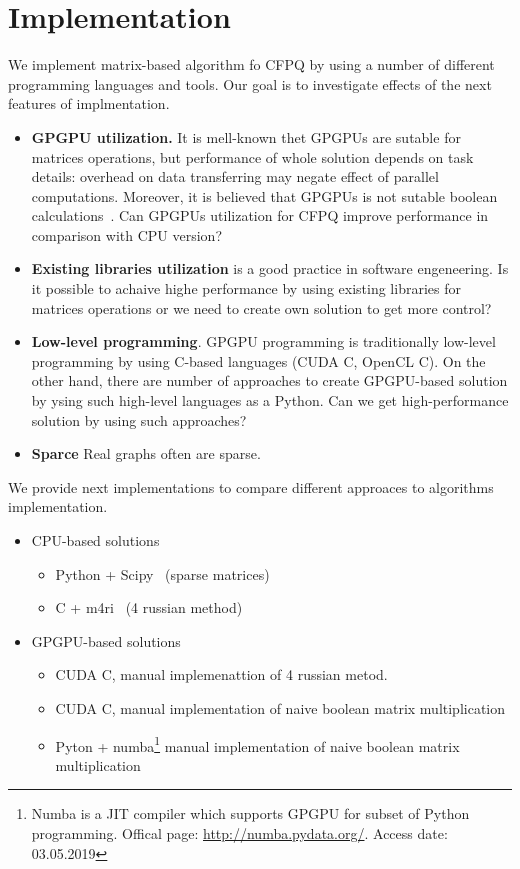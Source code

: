 \section{Implementation}

We implement matrix-based algorithm fo CFPQ by using a number of different programming languages and tools.
Our goal is to investigate effects of the next features of implmentation.
\begin{itemize}
\item \textbf{GPGPU utilization.} 
It is mell-known thet GPGPUs are sutable for matrices operations, but performance of whole solution depends on task details: overhead on data transferring may negate effect of parallel computations. 
Moreover, it is believed that GPGPUs is not sutable boolean calculations~\cite{!!!}. 
Can GPGPUs utilization for CFPQ improve performance in comparison with CPU version?

\item \textbf{Existing libraries utilization} is a good practice in software engeneering.
Is it possible to achaive highe performance by using existing libraries for matrices operations or we need to create own solution to get more control?

\item \textbf{Low-level programming}. 
GPGPU programming is traditionally low-level programming by using C-based languages (CUDA C, OpenCL C). 
On the other hand, there are number of approaches to create GPGPU-based solution by ysing such high-level languages as a Python. 
Can we get high-performance solution by using such approaches?

\item \textbf{Sparce} Real graphs often are sparse. 

\end{itemize}
We provide next implementations to compare different approaces to algorithms implementation.

\begin{itemize}
  \item CPU-based solutions 
  \begin{itemize}
    \item Python + Scipy~\cite{scipy} (sparse matrices)
    \item C + m4ri~\cite{M4RI} (4 russian method)
  \end{itemize}
  \item GPGPU-based solutions
  \begin{itemize}
    \item CUDA C, manual implemenattion of 4 russian metod.
    \item CUDA C, manual implementation of naive boolean matrix multiplication
    \item Pyton + numba\footnote{Numba is a JIT compiler which supports GPGPU for subset of Python programming. Offical page: \url{http://numba.pydata.org/}. Access date: 03.05.2019} manual implementation of naive boolean matrix multiplication
  \end{itemize}
\end{itemize}


